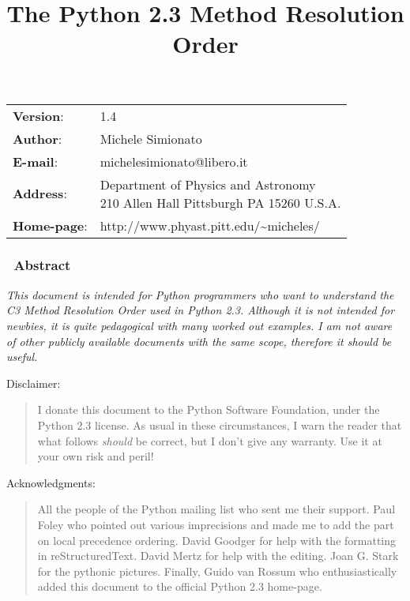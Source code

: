 \documentclass[10pt,a4paper,english]{article}
\title{The Python 2.3 Method Resolution Order}
\author{}
\date{}
\newlength{\docinfowidth}
\newlength{\locallinewidth}
\begin{document}
\maketitle

\begin{center}
\begin{tabularx}{\docinfowidth}{lX}
\textbf{Version}: &
	1.4 \\
\textbf{Author}: &
	Michele Simionato \\
\textbf{E-mail}: &
	michelesimionato@libero.it \\
\textbf{Address}: &
	{\raggedright
Department of Physics and Astronomy~\\
210 Allen Hall Pittsburgh PA 15260 U.S.A. } \\
\textbf{Home-page}: &
	http://www.phyast.pitt.edu/{\textasciitilde}micheles/ \\
\end{tabularx}
\end{center}

\setlength{\locallinewidth}{\linewidth}


\subsubsection*{~\hfill Abstract\hfill ~}

\emph{This document is intended for Python programmers who want to
understand the C3 Method Resolution Order used in Python 2.3.
Although it is not intended for newbies, it is quite pedagogical with
many worked out examples.  I am not aware of other publicly available
documents with the same scope, therefore it should be useful.}


Disclaimer:
\begin{quote}

I donate this document to the Python Software Foundation, under the
Python 2.3 license.  As usual in these circumstances, I warn the
reader that what follows \emph{should} be correct, but I don't give any
warranty.  Use it at your own risk and peril!
\end{quote}

Acknowledgments:
\begin{quote}

All the people of the Python mailing list who sent me their support.
Paul Foley who pointed out various imprecisions and made me to add the
part on local precedence ordering. David Goodger for help with the
formatting in reStructuredText. David Mertz for help with the editing.
Joan G. Stark for the pythonic pictures. Finally, Guido van Rossum who 
enthusiastically added this document to the official Python 2.3 home-page.
\end{quote}
\end{document}
